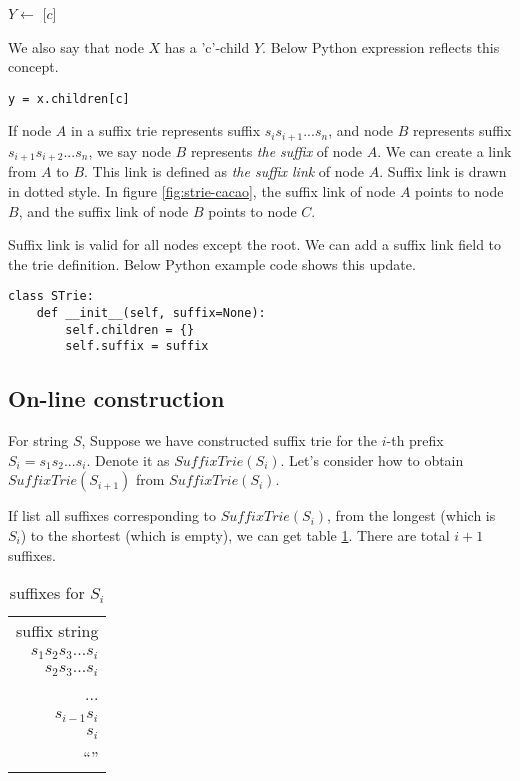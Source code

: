 \documentclass{article}
\begin{document}
\begin{algorithmic}
\State $Y \gets$ [$c$]
\end{algorithmic}

We also say that node $X$ has a 'c'-child $Y$. Below Python expression
reflects this concept.

\lstset{language=python}
\begin{lstlisting}
y = x.children[c]
\end{lstlisting}

If node $A$ in a suffix trie represents suffix $s_is_{i+1}...s_n$,
and node $B$ represents suffix $s_{i+1}s_{i+2}...s_n$, we say node $B$
represents {\em the suffix} of node $A$. We can create a link from $A$ to $B$.
This link is defined as {\em the suffix link} of node $A$\cite{ukkonen95}.
Suffix link is drawn in dotted style. In figure \ref{fig:strie-cacao}, the suffix link of
node $A$ points to node $B$, and the suffix link of node $B$ points to node $C$.

Suffix link is valid for all nodes except the root. We can add a suffix link field to
the trie definition. Below Python example code shows this update.

\lstset{language=Python}
\begin{lstlisting}
class STrie:
    def __init__(self, suffix=None):
        self.children = {}
        self.suffix = suffix
\end{lstlisting}

\subsection{On-line construction}

For string $S$, Suppose we have constructed suffix trie for the $i$-th prefix
$S_i=s_1s_2...s_i$. Denote it as $SuffixTrie(S_i)$.
Let's consider how to obtain $SuffixTrie(S_{i+1})$ from $SuffixTrie(S_i)$.

If list all suffixes corresponding to $SuffixTrie(S_i)$, from the longest
(which is $S_i$) to the shortest (which is empty), we can get
table \ref{tab:suffixes_s_i}. There are total $i+1$ suffixes.

\begin{table}
  \begin{tabular}{r}
    suffix string \\
    $s_1s_2s_3...s_i$ \\
    $s_2s_3...s_i$ \\
    ... \\
    $s_{i-1}s_i$ \\
    $s_i$ \\
    ``'' \\
  \end{tabular}
  \caption{suffixes for $S_i$}
  \label{tab:suffixes_s_i}
\end{table}
\end{document}
